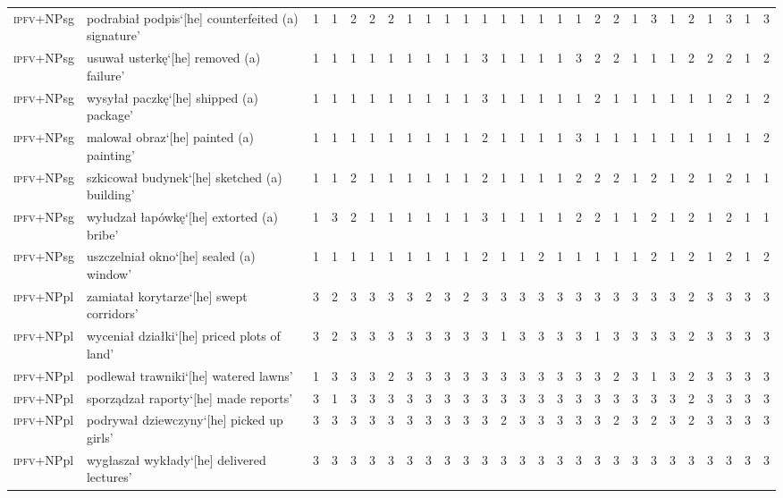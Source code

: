 \documentclass[output=paper]{langscibook}
\begin{document}
\begin{paperappendix}
\begin{sidewaystable}
{\begin{tabular}{l>{\raggedright}p{5cm}rrrrrrrrrrrrrrrrrrrrrrrrr}
\textsc{ipfv}+NPsg&podrabiał podpis\newline  `[he] counterfeited (a) signature'&1&1&2&2&2&1&1&1&1&1&1&1&1&1&1&2&2&1&3&1&2&1&3&1&3\\
\textsc{ipfv}+NPsg&usuwał usterkę\newline  `[he] removed (a) failure'&1&1&1&1&1&1&1&1&1&3&1&1&1&1&3&2&2&1&1&1&2&2&2&1&2\\
\textsc{ipfv}+NPsg&wysyłał paczkę\newline  `[he] shipped (a) package'&1&1&1&1&1&1&1&1&1&3&1&1&1&1&1&2&1&1&1&1&1&1&2&1&2\\
\textsc{ipfv}+NPsg&malował obraz\newline  `[he] painted (a) painting'&1&1&1&1&1&1&1&1&1&2&1&1&1&1&3&1&1&1&1&1&1&1&1&1&2\\
\textsc{ipfv}+NPsg&szkicował budynek\newline  `[he] sketched (a) building'&1&1&2&1&1&1&1&1&1&2&1&1&1&1&2&2&2&1&2&1&2&1&2&1&1\\
\textsc{ipfv}+NPsg&wyłudzał łapówkę\newline  `[he] extorted (a) bribe'&1&3&2&1&1&1&1&1&1&3&1&1&1&1&2&2&1&1&2&1&2&1&2&1&1\\
\textsc{ipfv}+NPsg&uszczelniał okno\newline  `[he] sealed (a) window'&1&1&1&1&1&1&1&1&1&2&1&1&2&1&1&1&1&1&2&1&2&1&2&1&2\\
\textsc{ipfv}+NPpl&zamiatał korytarze\newline  `[he] swept corridors'&3&2&3&3&3&3&2&3&2&3&3&3&3&3&3&3&3&3&3&3&2&3&3&3&3\\
\textsc{ipfv}+NPpl&wyceniał działki\newline  `[he] priced plots of land'&3&2&3&3&3&3&3&3&3&3&1&3&3&3&3&1&3&3&3&3&2&3&3&3&3\\
\textsc{ipfv}+NPpl&podlewał trawniki\newline  `[he] watered lawns'&1&3&3&3&2&3&3&3&3&3&3&3&3&3&3&3&2&3&1&3&2&3&3&3&3\\
\textsc{ipfv}+NPpl&sporządzał raporty\newline  `[he] made reports'&3&1&3&3&3&3&3&3&3&3&3&3&3&3&3&3&3&3&3&3&2&3&3&3&3\\
\textsc{ipfv}+NPpl&podrywał dziewczyny\newline  `[he] picked up girls'&3&3&3&3&3&3&3&3&3&3&2&3&3&3&3&3&2&3&2&3&2&3&3&3&3\\
\textsc{ipfv}+NPpl&wygłaszał wykłady\newline  `[he] delivered lectures'&3&3&3&3&3&3&3&3&3&3&3&3&3&3&3&3&3&3&3&3&3&3&3&3&3\\

\end{tabular}}
\end{sidewaystable}
\end{paperappendix}
\end{document}
